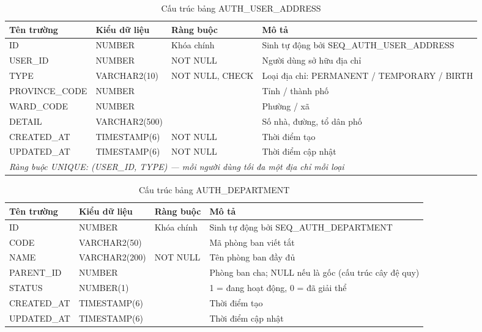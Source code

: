 \documentclass[../DoAn.tex]{subfiles}
\begin{document}
\begin{table}[H]
\centering
\caption{Cấu trúc bảng AUTH\_USER\_ADDRESS}
\label{tab:auth-user-address}
\footnotesize
\begin{tabular}{|p{3.0cm}|p{2.3cm}|p{2.7cm}|p{4.5cm}|}
\hline
\textbf{Tên trường} & \textbf{Kiểu dữ liệu} & \textbf{Ràng buộc} & \textbf{Mô tả} \\ \hline
ID & NUMBER & Khóa chính & Sinh tự động bởi SEQ\_AUTH\_USER\_ADDRESS \\ \hline
USER\_ID & NUMBER & NOT NULL & Người dùng sở hữu địa chỉ \\ \hline
TYPE & VARCHAR2(10) & NOT NULL, CHECK & Loại địa chỉ: PERMANENT / TEMPORARY / BIRTH \\ \hline
PROVINCE\_CODE & NUMBER & & Tỉnh / thành phố \\ \hline
WARD\_CODE & NUMBER & & Phường / xã \\ \hline
DETAIL & VARCHAR2(500) & & Số nhà, đường, tổ dân phố \\ \hline
CREATED\_AT & TIMESTAMP(6) & NOT NULL & Thời điểm tạo \\ \hline
UPDATED\_AT & TIMESTAMP(6) & NOT NULL & Thời điểm cập nhật \\ \hline
\multicolumn{4}{|l|}{\textit{Ràng buộc UNIQUE: (USER\_ID, TYPE) — mỗi người dùng tối đa một địa chỉ mỗi loại}} \\ \hline
\end{tabular}
\end{table}

\begin{table}[H]
\centering
\caption{Cấu trúc bảng AUTH\_DEPARTMENT}
\label{tab:auth-department}
\footnotesize
\begin{tabular}{|p{3.0cm}|p{2.3cm}|p{2.7cm}|p{4.5cm}|}
\hline
\textbf{Tên trường} & \textbf{Kiểu dữ liệu} & \textbf{Ràng buộc} & \textbf{Mô tả} \\ \hline
ID & NUMBER & Khóa chính & Sinh tự động bởi SEQ\_AUTH\_DEPARTMENT \\ \hline
CODE & VARCHAR2(50) & & Mã phòng ban viết tắt \\ \hline
NAME & VARCHAR2(200) & NOT NULL & Tên phòng ban đầy đủ \\ \hline
PARENT\_ID & NUMBER & & Phòng ban cha; NULL nếu là gốc (cấu trúc cây đệ quy) \\ \hline
STATUS & NUMBER(1) & & 1 = đang hoạt động, 0 = đã giải thể \\ \hline
CREATED\_AT & TIMESTAMP(6) & & Thời điểm tạo \\ \hline
UPDATED\_AT & TIMESTAMP(6) & & Thời điểm cập nhật \\ \hline
\end{tabular}
\end{table}
\end{document}
